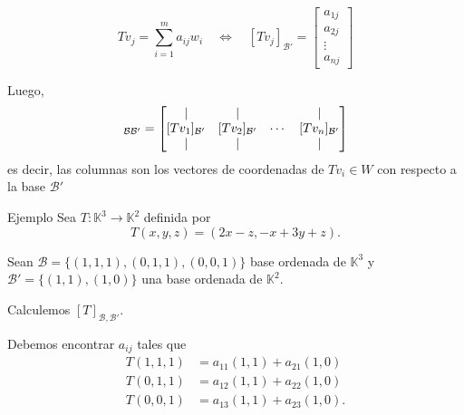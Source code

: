 \documentclass[handout]{beamer} %
\newcommand{\K}{\mathbb K}
\newcommand{\cB}{\mathcal{B}}
\begin{document}
    \begin{frame}
    
    \begin{observacion}
        \begin{equation*}\label{matriz-de-T-1}
            Tv_j = \sum_{i=1}^{m} a_{ij} w_i \quad \Leftrightarrow \quad [Tv_j ]_{\cB'} =\begin{bmatrix}
                a_{1j} \\ a_{2j} \\ \vdots \\ a_{nj} 
            \end{bmatrix}
        \end{equation*}\pause
    
    Luego, 
    \begin{align*}
    [T]_{\cB\cB'}=
    \begin{bmatrix}
        \mid& \mid& &\mid\\
    $[$Tv_1$]$_{\cB'}&$[$Tv_2$]$_{\cB'}&\cdots&$[$Tv_n$]$_{\cB'}\\
    \mid& \mid& &\mid
    \end{bmatrix}
    \end{align*}
    es decir, las columnas son los vectores de coordenadas de $Tv_i\in W$ con respecto a la base $\cB'$
    \end{observacion}
    
    \end{frame}
    
    
        
        
        \begin{frame}
        
        
        \begin{exampleblock}{Ejemplo}
        Sea $T:\K^3\longrightarrow\K^2$ definida por 
        $$T(x,y,z)=(2x-z,-x+3y+z).$$

        Sean $\cB=\{(1,1,1),(0,1,1),(0,0,1)\}$ base ordenada de $\K^3$ y $\cB' = \{(1,1), (1,0)\}$ una base ordenada de $\K^2$.

        Calculemos $[T]_{\cB,\cB'}$. \pause
        
        Debemos encontrar $a_{ij}$ tales que 
        \begin{align*}
            T(1,1,1) &= a_{11}(1,1) + a_{21}(1,0)\\
            T(0,1,1) &= a_{12}(1,1) + a_{22}(1,0)\\
            T(0,0,1) &= a_{13}(1,1) + a_{23}(1,0).
        \end{align*}

        \end{exampleblock}
        
        
        \end{frame}
\end{document}
